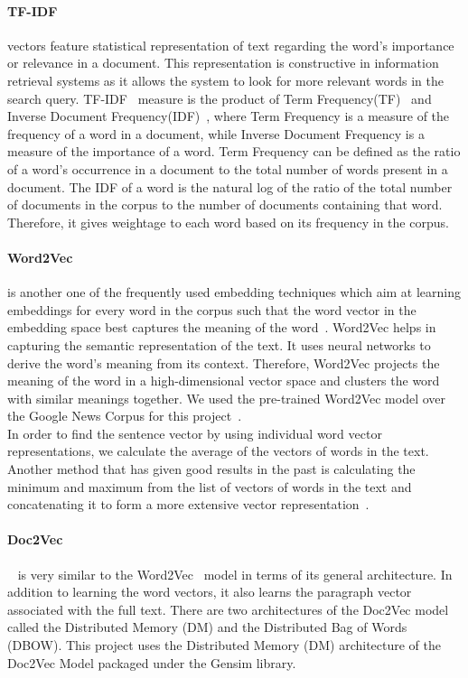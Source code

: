 \documentclass[conference]{IEEEtran}
\begin{document}
\paragraph{TF-IDF} vectors feature statistical representation of text regarding the word's importance or relevance in a document. This representation is constructive in information retrieval systems as it allows the system to look for more relevant words in the search query.
TF-IDF~\cite{tfidf} measure is the product of Term Frequency(TF)~\cite{tf} and Inverse Document Frequency(IDF)~\cite{idf}, where Term Frequency is a measure of the frequency of a word in a document, while Inverse Document Frequency is a measure of the importance of a word. Term Frequency can be defined as the ratio of a word's occurrence in a document to the total number of words present in a document. The IDF of a word is the natural log of the ratio of the total number of documents in the corpus to the number of documents containing that word. Therefore, it gives weightage to each word based on its frequency in the corpus.
\paragraph{Word2Vec} is another one of the frequently used embedding techniques which aim at learning embeddings for every word in the corpus such that the word vector in the embedding space best captures the meaning of the word~\cite{nlp_prac_book}. Word2Vec helps in capturing the semantic representation of the text. It uses neural networks to derive the word’s meaning from its context. Therefore, Word2Vec projects the meaning of the word in a high-dimensional vector space and clusters the word with similar meanings together. We used the pre-trained Word2Vec model over the Google News Corpus for this project~\cite{w2v}.\\
In order to find the sentence vector by using individual word vector representations, we calculate the average of the vectors of words in the text. Another method that has given good results in the past is calculating the minimum and maximum from the list of vectors of words in the text and concatenating it to form a more extensive vector representation~\cite{minmax}.
\paragraph{Doc2Vec}~\cite{d2v} is very similar to the Word2Vec~\cite{w2v} model in terms of its general architecture. In addition to learning the word vectors, it also learns the paragraph vector associated with the full text. There are two architectures of the Doc2Vec model called the Distributed Memory (DM) and the Distributed Bag of Words (DBOW). This project uses the Distributed Memory (DM) architecture of the Doc2Vec Model packaged under the Gensim library. 
\end{document}
